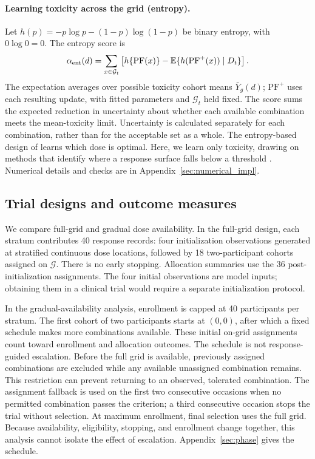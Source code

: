 \documentclass[11pt]{article}
\newcommand{\rev}[1]{{#1}}
\newcommand{\revisioncolor}{}
\newcommand{\PF}{\mathrm{PF}}
\begin{document}
\paragraph{\rev{Learning toxicity across the grid (entropy).}} \rev{Let $h(p)=-p\log p-(1-p)\log(1-p)$ be binary entropy, with $0\log0=0$. The entropy score is}
\begin{equation}\label{eq:sur}
\revisioncolor
\alpha_{\rm ent}(d)=\sum_{x\in\mathcal G_t}\left[
h\{\PF(x)\}-\mathbb E\{h(\PF^+(x))\mid D_t\}\right].
\end{equation}
The expectation averages over possible toxicity cohort means $\bar Y_g(d)$; $\PF^+$ uses each resulting update, with fitted parameters and $\mathcal G_t$ held fixed. The score sums the expected reduction in uncertainty about whether each available combination meets the mean-toxicity limit. Uncertainty is calculated separately for each combination, rather than for the acceptable set as a whole. The entropy-based design of \citet{domenicano2019} learns which dose is optimal. Here, we learn only toxicity, drawing on methods that identify where a response surface falls below a threshold \citep{bect2012,chevalier2014,marques2018}. Numerical details and checks are in Appendix~\ref{sec:numerical_impl}.

\subsection{\rev{Trial designs and outcome measures}}\label{sec:protocol}

\rev{We compare full-grid and gradual dose availability. In the full-grid design, each stratum contributes 40 response records: four initialization observations generated at stratified continuous dose locations, followed by 18 two-participant cohorts assigned on $\mathcal G$. There is no early stopping. Allocation summaries use the 36 post-initialization assignments. The four initial observations are model inputs; obtaining them in a clinical trial would require a separate initialization protocol.}

In the gradual-availability analysis, enrollment is capped at 40 participants per stratum. \rev{The first cohort of two participants starts at $(0,0)$}, after which a fixed schedule makes more combinations available. These initial on-grid assignments count toward enrollment and allocation outcomes. The schedule is not response-guided escalation. Before the full grid is available, previously assigned combinations are excluded while any available unassigned combination remains. This restriction can prevent returning to an observed, tolerated combination. The assignment fallback is used on the first two consecutive occasions when no permitted combination passes the criterion; \rev{a third consecutive occasion stops the trial without selection}. At maximum enrollment, final selection uses the full grid. \rev{Because availability, eligibility, stopping, and enrollment change together, this analysis cannot isolate the effect of escalation.} Appendix~\ref{sec:phase} gives the schedule.
\end{document}
